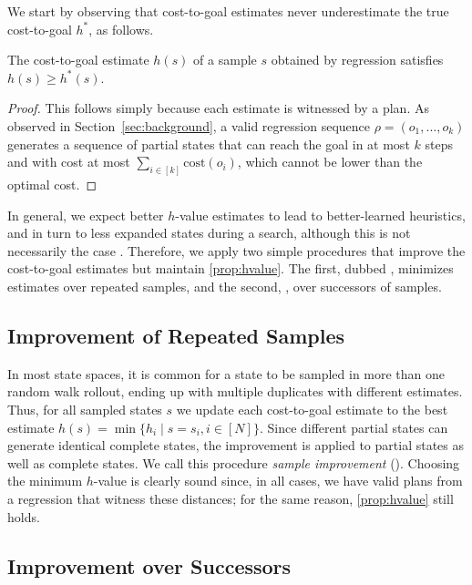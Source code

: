 We start by observing that cost-to-goal estimates never underestimate the true cost-to-goal $h^{*}$, as follows.

\begin{property}
    \label{prop:hvalue}
    The cost-to-goal estimate $h(s)$ of a sample $s$ obtained by regression satisfies $h(s)\geq h^*(s)$.
\end{property}
\begin{proof}
    This follows simply because each estimate is witnessed by a plan. As observed in Section~\ref{sec:background}, a valid regression sequence $\rho=(o_1,\ldots,o_k)$ generates a sequence of partial states that can reach the goal in at most $k$ steps and with cost at most $\sum_{i\in[k]}\text{cost}(o_i)$, which cannot be lower than the optimal cost.
\end{proof}

In general, we expect better $h$-value estimates to lead to better-learned heuristics, and in turn to less expanded states during a search, although this is not necessarily the case \cite{Holte/2010}. Therefore, we apply two simple procedures that improve the cost-to-goal estimates but maintain \cref{prop:hvalue}. The first, dubbed \hmin, minimizes estimates over repeated samples, and the second, \hvfc, over successors of samples.

\subsection{Improvement of Repeated Samples}
\label{sec:hmin}

In most state spaces, it is common for a state to be sampled in more than one random walk rollout, ending up with multiple duplicates with different estimates. Thus, for all sampled states $s$ we update each cost-to-goal estimate to the best estimate $h(s) = \min\{h_i \mid s=s_i, i\in[N]\}$. Since different partial states can generate identical complete states, the improvement is applied to partial states as well as complete states. We call this procedure \emph{sample improvement} (\hmin). Choosing the minimum $h$-value is clearly sound since, in all cases, we have valid plans from a regression that witness these distances; for the same reason, \cref{prop:hvalue} still holds.

\subsection{Improvement over Successors}
\label{sec:hvfc}

